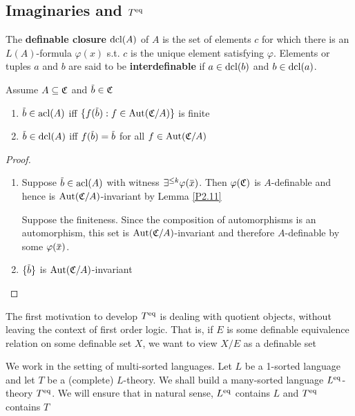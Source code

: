 \documentclass[11pt]{article}
\begin{document}
\subsection{Imaginaries and \texorpdfstring{\(T^{\operatorname{eq}}\)}{Teq}}
\label{sec:org844390b}
\begin{definition}[]
The \textbf{definable closure} \(\operatorname{dcl}(A)\) of \(A\) is the set of elements \(c\) for which there is
an \(L(A)\)-formula \(\varphi(x)\) s.t. \(c\) is the unique element satisfying \(\varphi\). Elements or
tuples \(a\) and \(b\) are said to be \textbf{interdefinable} if \(a\in\operatorname{dcl}(b)\) and \(b\in\operatorname{dcl}(a)\).
\end{definition}

\begin{lemma}[]
Assume \(A\subseteq\mathfrak{C}\) and \(\barb\in\fC\)
\begin{enumerate}
\item \(\barb\in\acl(A)\) iff \(\{f(\barb):f\in\Aut(\fC/A)\}\) is finite
\item \(\barb\in\dcl(A)\) iff \(f(\barb)=\barb\) for all \(f\in\operatorname{\text{Aut}}(\mathfrak{C}/A)\)
\end{enumerate}
\end{lemma}

\begin{proof}
\begin{enumerate}
\item Suppose \(\barb\in\acl(A)\) with witness \(\exists^{\le k}\varphi(\barx)\). Then \(\varphi(\mathfrak{C})\) is \(A\)-definable
and hence is \(\operatorname{\text{Aut}}(\mathfrak{C}/A)\)-invariant by Lemma \ref{P2.11}

Suppose the finiteness. Since the composition of automorphisms is an automorphism, this set
is \(\operatorname{\text{Aut}}(\mathfrak{C}/A)\)-invariant and therefore \(A\)-definable by some \(\varphi(\barx)\).

\item \(\{\barb\}\) is \(\operatorname{\text{Aut}}(\mathfrak{C}/A)\)-invariant
\end{enumerate}
\end{proof}

The first motivation to develop \(T^{\operatorname{eq}}\) is dealing with quotient objects, without leaving
the context of first order logic. That is, if \(E\) is some definable equivalence relation on
some definable set \(X\), we want to view \(X/E\) as a definable set

We work in the setting of multi-sorted languages. Let \(L\) be a 1-sorted language and let \(T\)
be a (complete) \(L\)-theory. We shall build a many-sorted
language \(L^{\operatorname{eq}}\)-theory \(T^{\operatorname{eq}}\). We will ensure that in natural sense, \(L^{\operatorname{eq}}\)
contains \(L\) and \(T^{\operatorname{eq}}\) contains \(T\)
\end{document}
